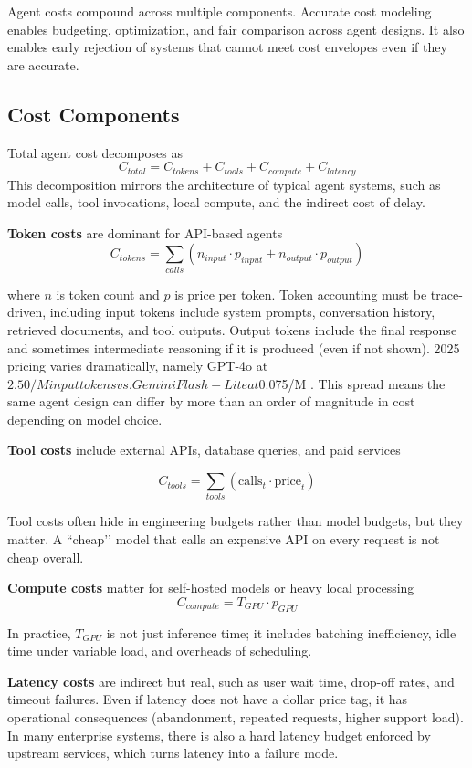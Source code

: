 Agent costs compound across multiple components. Accurate cost modeling enables budgeting, optimization, and fair comparison across agent designs. It also enables early rejection of systems that cannot meet cost envelopes even if they are accurate.

\subsection{Cost Components}

Total agent cost decomposes as
\[
C_{total} = C_{tokens} + C_{tools} + C_{compute} + C_{latency}
\]
This decomposition mirrors the architecture of typical agent systems, such as model calls, tool invocations, local compute, and the indirect cost of delay.

\textbf{Token costs} are dominant for API-based agents
\[
C_{tokens} = \sum_{calls} (n_{input} \cdot p_{input} + n_{output} \cdot p_{output})
\]

where $n$ is token count and $p$ is price per token. Token accounting must be trace-driven, including input tokens include system prompts, conversation history, retrieved documents, and tool outputs. Output tokens include the final response and sometimes intermediate reasoning if it is produced (even if not shown). 2025 pricing varies dramatically, namely GPT-4o at $2.50/M input tokens vs. Gemini Flash-Lite at $0.075/M \cite{llmpricing2025}. This spread means the same agent design can differ by more than an order of magnitude in cost depending on model choice.

\textbf{Tool costs} include external APIs, database queries, and paid services

\[
C_{tools} = \sum_{tools} (\text{calls}_t \cdot \text{price}_t)
\]

Tool costs often hide in engineering budgets rather than model budgets, but they matter. A ``cheap’’ model that calls an expensive API on every request is not cheap overall.

\textbf{Compute costs} matter for self-hosted models or heavy local processing
\[
C_{compute} = T_{GPU} \cdot p_{GPU}
\]

In practice, $T_{GPU}$ is not just inference time; it includes batching inefficiency, idle time under variable load, and overheads of scheduling.

\textbf{Latency costs} are indirect but real, such as user wait time, drop-off rates, and timeout failures. Even if latency does not have a dollar price tag, it has operational consequences (abandonment, repeated requests, higher support load). In many enterprise systems, there is also a hard latency budget enforced by upstream services, which turns latency into a failure mode.

